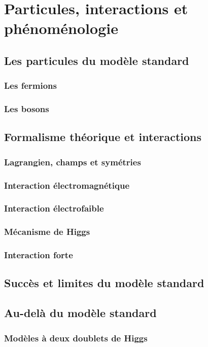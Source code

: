\chapter{Particules, interactions et phénoménologie}

\section{Les particules du modèle standard}
\subsection{Les fermions}
\subsection{Les bosons}

\section{Formalisme théorique et interactions}
\subsection{Lagrangien, champs et symétries}
\subsection{Interaction électromagnétique}
\subsection{Interaction électrofaible}
\subsection{Mécanisme de Higgs}
\subsection{Interaction forte}

\section{Succès et limites du modèle standard}

\section{Au-delà du modèle standard}
\subsection{Modèles à deux doublets de Higgs}
